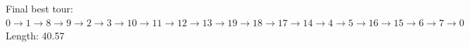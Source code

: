 \noindent\colorbox{gray!15}{\parbox{\dimexpr\linewidth-2\fboxsep}{
Final best tour:\\
$0 \to 1 \to 8 \to 9 \to 2 \to 3 \to 10 \to 11 \to 12 \to 13 \to 19 \to 18 \to 17 \to 14 \to 4 \to 5 \to 16 \to 15 \to 6 \to 7 \to 0$\\
Length: 40.57
}}
